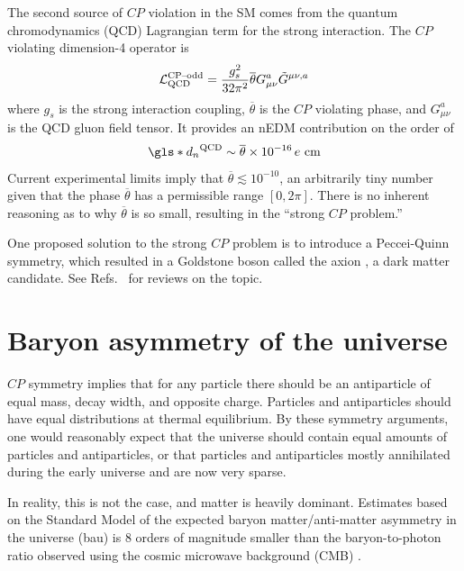 The second source of $CP$ violation in the SM comes from the quantum chromodynamics (QCD) Lagrangian term for the strong interaction. The $CP$ violating dimension-4 operator is
%
\begin{gather}
    \mathcal{L}_\text{QCD}^\text{CP\textendash odd}=\frac{g^2_s}{32\pi^2}\overline{\theta}G^a_{\mu\nu}\tilde{G}^{\mu\nu, a}
\end{gather}
%
where $g_s$ is the strong interaction coupling, $\overline{\theta}$ is the $CP$ violating phase, and $G^a_{\mu\nu}$ is the QCD gluon field tensor. It provides an nEDM contribution on the order of \cite{cp_violation_wo_strangeness}
%
\begin{gather}
    \gls*{d_n}^\text{QCD}\sim \overline{\theta}\times 10^{-16}\,e\text{ cm}
\end{gather}
%
Current experimental limits imply that $\overline{\theta}\lesssim 10^{-10}$, an arbitrarily tiny number given that the phase $\overline{\theta}$ has a permissible range $[0, 2\pi]$. There is no inherent reasoning as to why $\overline{\theta}$ is so small, resulting in the ``strong $CP$ problem.''

One proposed solution to the strong $CP$ problem is to introduce a Peccei-Quinn symmetry, which resulted in a Goldstone boson called the axion \cite{peccei_quinn_axion}, a dark matter candidate. See Refs.~\cite{BAER20151, kim_gianpaolo_2010} for reviews on the topic.


\section{Baryon asymmetry of the universe}


$CP$ symmetry implies that for any particle there should be an antiparticle of equal mass, decay width, and opposite charge. Particles and antiparticles should have equal distributions at thermal equilibrium. By these symmetry arguments, one would reasonably expect that the universe should contain equal amounts of particles and antiparticles, or that particles and antiparticles mostly annihilated during the early universe and are now very sparse.

In reality, this is not the case, and matter is heavily dominant. Estimates based on the Standard Model of the expected baryon matter/anti-matter asymmetry in the universe (\acrshort*{bau}) is 8 orders of magnitude smaller than the baryon-to-photon ratio observed using the cosmic microwave background (CMB) \cite{Mor13, Dubbers2011}.


